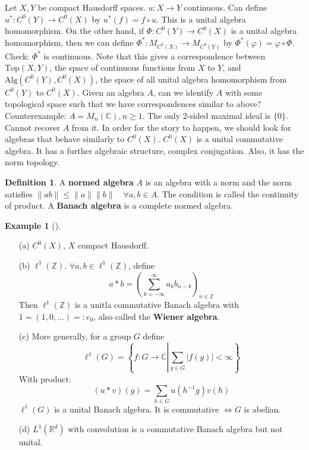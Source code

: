 \documentclass{article}
\theoremstyle{definition}
\newtheorem{ex}{Example}
\newtheorem{dfn}{Definition}
\newenvironment{exs}[1][]{%
  \begin{ex}[#1]$ $\par\nobreak\ignorespaces
}{%
  \end{ex}
}
\newcommand{\CC}{\mathbb C}
\newcommand{\RR}{\mathbb R}
\newcommand{\ZZ}{\mathbb Z}
\newcommand{\Lra}{\Leftrightarrow}
\begin{document}
Let $X, Y$ be compact Hausdorff spaces.
$u: X \to Y$ continuous.
Can define $u^*: C^0(Y) \to C^0(X)$ by $u^*(f) = f \circ u$.
This is a unital algebra homomorphism.
On the other hand, if $\Phi: C^0(Y) \to C^0(X)$ is a unital algebra homomorphism, then we can define $\Phi^*: M_{C^0(X)} \to M_{C^0(Y)}$ by $\Phi^*(\varphi) = \varphi \circ \Phi$.
Check: $\Phi^*$ is continuous.
Note that this gives a correspondence between $\text{Top}(X, Y)$, the space of continuous functions from $X$ to $Y$, and $\text{Alg}(C^0(Y), C^0(X))$, the space of all unital algebra homomorphism from $C^0(Y)$ to $C^0(X)$.
Given an algebra $A$, can we identify $A$ with some topological space such that we have correspondences similar to above?
Counterexample: $A = M_n(\CC), n \geq 1$.
The only 2-sided maximal ideal is $\{0\}$.
Cannot recover $A$ from it.
In order for the story to happen, we should look for algebras that behave similarly to $C^0(X)$.
$C^0(X)$ is a unital commutative algebra.
It has a further algebraic structure, complex conjugation.
Also, it has the norm topology.

\begin{dfn}
	A \textbf{normed algebra} $A$ is an algebra with a norm and the norm satisfies $\|ab\| \leq \|a\|\|b\| \quad \forall a, b \in A$.
	The condition is called the continuity of product.
	A \textbf{Banach algebra} is a complete normed algebra.
\end{dfn}

\begin{exs}
	\begin{enumerate}
		\item[(a)] $C^0(X)$, $X$ compact Hausdorff.

		\item[(b)] $\ell^1(\ZZ)$.
			$\forall a, b \in \ell^1(\ZZ)$, define
			\[
				a * b = \left( \sum_{k = -\infty}^\infty a_k b_{n - k} \right)_{n \in \ZZ}
			\]
			Then $\ell^1(\ZZ)$ is a unitla commutative Banach algebra with $1 = (1, 0, ...) =: e_0$, also called the \textbf{Wiener algebra}.

		\item[(c)] More generally, for a group $G$ define 
			\[
				\ell^1(G) = \left\{ f: G \to \CC \left| \sum_{g \in G} |f(g)| < \infty \right.\right\}
			\]
			With product:
			\[
				(u * v) (g) = \sum_{h \in G} u(h^{-1} g) v(h)
			\]
			$\ell^1(G)$ is a unital Banach algebra.
			It is commutative $\Lra G$ is abelian.

		\item[(d)] $L^1(\RR^d)$ with convolution is a commutative Banach algebra but not unital.
	\end{enumerate}
\end{exs}
\end{document}
